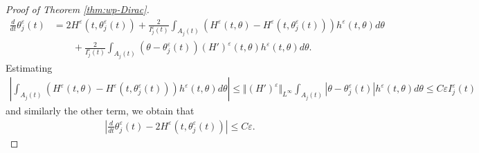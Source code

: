 \documentclass[10pt]{article}
\theoremstyle{definition}
\theoremstyle{remark}
\numberwithin{equation}{section}
\newcommand{\nrm}[1]{\Vert#1\Vert}
\newcommand{\0}{\emptyset}
\newcommand{\tht}{\theta}
\newcommand{\varep}{\varepsilon}
\begin{document}
\begin{proof}[Proof of Theorem \ref{thm:wp-Dirac}]
\begin{equation*}
			\begin{split}
				\frac{d}{dt} \tht_{j}^{\varep}(t) & = 2H^\varep(t, \tht_{j}^{\varep}(t) ) + \frac{2}{I_{j}^{\varep}(t)   } \int_{A_{j}(t)} ( H^\varep(t,\tht) - H^\varep(t,\tht_{j}^{\varep}(t) ) ) h^\varep(t,\tht) d\tht \\
				&\qquad  + \frac{2}{I_{j}^{\varep}(t) }\int_{A_{j}(t)} (\tht - \tht^\varep_j(t))(H')^\varep(t,\tht) h^\varep(t,\tht) d\tht. 
			\end{split}
		\end{equation*} Estimating \begin{equation*}
			\begin{split}
				\left| \int_{A_{j}(t)} ( H^\varep(t,\tht) - H^\varep(t,\tht_{j}^{\varep}(t) ) ) h^\varep(t,\tht) d\tht\right| \le \nrm{ (H')^\varep }_{L^\infty}  \int_{A_{j}(t)} |\tht -\tht_{j}^{\varep}(t) |h^\varep(t,\tht) d\tht \le C\varep I_j^{\varep}(t)
			\end{split}
		\end{equation*} and similarly the other term, we obtain that \begin{equation}\label{eq:ODE-tht-varep}
			\begin{split}
				\left|  \frac{d}{dt} \tht_{j}^{\varep}(t) - 2H^{\varep}(t, \tht_{j}^{\varep}(t) ) \right| \le C\varep. 
			\end{split}
		\end{equation} 
		

\end{proof}
\end{document}
